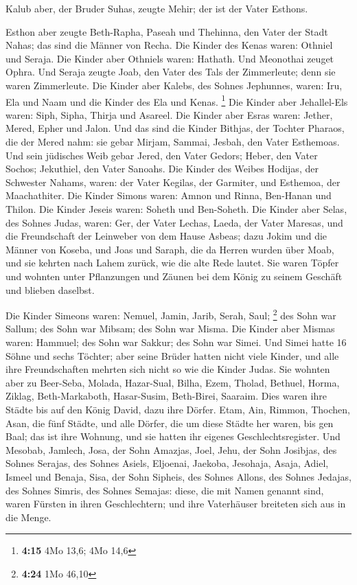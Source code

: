  Kalub aber, der Bruder Suhas, zeugte Mehir; der ist der
Vater Esthons.

 Esthon aber zeugte Beth-Rapha, Paseah und Thehinna, den
Vater der Stadt Nahas; das sind die Männer von Recha.  Die
Kinder des Kenas waren: Othniel und Seraja. Die Kinder aber Othniels
waren: Hathath.  Und Meonothai zeuget Ophra. Und Seraja
zeugte Joab, den Vater des Tals der Zimmerleute; denn sie waren
Zimmerleute.  Die Kinder aber Kalebs, des Sohnes Jephunnes,
waren: Iru, Ela und Naam und die Kinder des Ela und Kenas. \footnote{\textbf{4:15}
  4Mo 13,6; 4Mo 14,6}  Die Kinder aber Jehallel-Els waren:
Siph, Sipha, Thirja und Asareel.  Die Kinder aber Esras
waren: Jether, Mered, Epher und Jalon. Und das sind die Kinder Bithjas,
der Tochter Pharaos, die der Mered nahm: sie gebar Mirjam, Sammai,
Jesbah, den Vater Esthemoas.  Und sein jüdisches Weib gebar
Jered, den Vater Gedors; Heber, den Vater Sochos; Jekuthiel, den Vater
Sanoahs.  Die Kinder des Weibes Hodijas, der Schwester
Nahams, waren: der Vater Kegilas, der Garmiter, und Esthemoa, der
Maachathiter.  Die Kinder Simons waren: Amnon und Rinna,
Ben-Hanan und Thilon. Die Kinder Jeseis waren: Soheth und Ben-Soheth.
 Die Kinder aber Selas, des Sohnes Judas, waren: Ger, der
Vater Lechas, Laeda, der Vater Maresas, und die Freundschaft der
Leinweber von dem Hause Asbeas;  dazu Jokim und die Männer
von Koseba, und Joas und Saraph, die da Herren wurden über Moab, und sie
kehrten nach Lahem zurück, wie die alte Rede lautet.  Sie
waren Töpfer und wohnten unter Pflanzungen und Zäunen bei dem König zu
seinem Geschäft und blieben daselbst.

 Die Kinder Simeons waren: Nemuel, Jamin, Jarib, Serah,
Saul; \footnote{\textbf{4:24} 1Mo 46,10}  des Sohn war
Sallum; des Sohn war Mibsam; des Sohn war Misma.  Die
Kinder aber Mismas waren: Hammuel; des Sohn war Sakkur; des Sohn war
Simei.  Und Simei hatte 16 Söhne und sechs Töchter; aber
seine Brüder hatten nicht viele Kinder, und alle ihre Freundschaften
mehrten sich nicht so wie die Kinder Judas.  Sie wohnten
aber zu Beer-Seba, Molada, Hazar-Sual,  Bilha, Ezem,
Tholad,  Bethuel, Horma, Ziklag, 
Beth-Markaboth, Hasar-Susim, Beth-Birei, Saaraim. Dies waren ihre Städte
bis auf den König David, dazu ihre Dörfer.  Etam, Ain,
Rimmon, Thochen, Asan, die fünf Städte,  und alle Dörfer,
die um diese Städte her waren, bis gen Baal; das ist ihre Wohnung, und
sie hatten ihr eigenes Geschlechtsregister.  Und Mesobab,
Jamlech, Josa, der Sohn Amazjas,  Joel, Jehu, der Sohn
Josibjas, des Sohnes Serajas, des Sohnes Asiels,  Eljoenai,
Jaekoba, Jesohaja, Asaja, Adiel, Ismeel und Benaja,  Sisa,
der Sohn Sipheis, des Sohnes Allons, des Sohnes Jedajas, des Sohnes
Simris, des Sohnes Semajas:  diese, die mit Namen genannt
sind, waren Fürsten in ihren Geschlechtern; und ihre Vaterhäuser
breiteten sich aus in die Menge.

